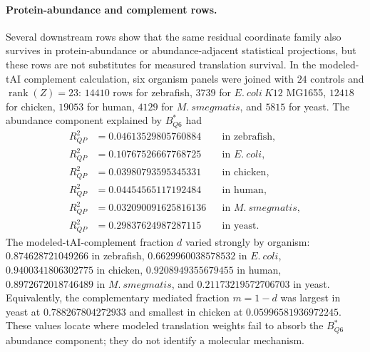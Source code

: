 \paragraph{Protein-abundance and complement rows.}
Several downstream rows show that the same residual coordinate family also survives in protein-abundance or abundance-adjacent statistical projections, but these rows are not substitutes for measured translation survival.  In the modeled-tAI complement calculation, six organism panels were joined with $24$ controls and $\operatorname{rank}(Z)=23$: $14410$ rows for zebrafish, $3739$ for $E.\ coli\ K12$ MG1655, $12418$ for chicken, $19053$ for human, $4129$ for $M.\ smegmatis$, and $5815$ for yeast.  The abundance component explained by $B^*_{Q6}$ had
$$
\begin{aligned}
R^2_{QP}&=0.04613529805760884 &&\text{in zebrafish},\\
R^2_{QP}&=0.10767526667768725 &&\text{in }E.\ coli,\\
R^2_{QP}&=0.03980793595345331 &&\text{in chicken},\\
R^2_{QP}&=0.04454565117192484 &&\text{in human},\\
R^2_{QP}&=0.032090091625816136 &&\text{in }M.\ smegmatis,\\
R^2_{QP}&=0.29837624987287115 &&\text{in yeast}.
\end{aligned}
$$
The modeled-tAI-complement fraction $d$ varied strongly by organism: $0.874628721049266$ in zebrafish, $0.6629960038578532$ in $E.\ coli$, $0.9400341806302775$ in chicken, $0.9208949355679455$ in human, $0.8972672018746489$ in $M.\ smegmatis$, and $0.21173219572706703$ in yeast.  Equivalently, the complementary mediated fraction $m=1-d$ was largest in yeast at $0.788267804272933$ and smallest in chicken at $0.05996581936972245$.  These values locate where modeled translation weights fail to absorb the $B^*_{Q6}$ abundance component; they do not identify a molecular mechanism.

